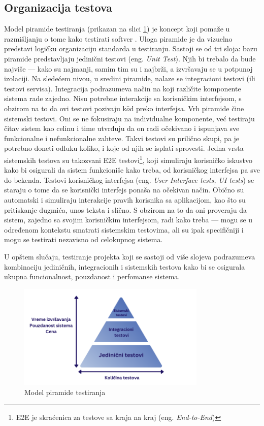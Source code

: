 \documentclass[12pt,oneside]{memoir}
\begin{document}
\subsection{Organizacija testova}
\par Model piramide testiranja (prikazan na slici \ref{fig:piramida}) je koncept koji pomaže u razmišljanju o tome kako testirati softver \cite{cohn}. Uloga piramide je da vizuelno predstavi logičku organizaciju standarda u testiranju. Sastoji se od tri sloja: bazu piramide predstavljaju jedinični testovi (eng. \emph{Unit Test}). Njih bi trebalo da bude najviše --- kako su najmanji, samim tim su i najbrži, a izvršavaju se u potpunoj izolaciji. Na sledećem nivou, u sredini piramide, nalaze se integracioni testovi (ili testovi servisa). Integracija podrazumeva način na koji različite komponente sistema rade zajedno. Nisu potrebne interakcije sa korisničkim interfejsom, s obzirom na to da ovi testovi pozivaju k$\hat{o}$d preko interfejsa. Vrh piramide čine sistemski testovi. Oni se ne fokusiraju na individualne komponente, već testiraju čitav sistem kao celinu i time utvrđuju da on radi očekivano i ispunjava sve funkcionalne i nefunkcionalne zahteve. Takvi testovi su prilično skupi, pa je potrebno doneti odluku koliko, i koje od njih se isplati sprovesti. Jedna vrsta sistemskih testova su takozvani E2E testovi\footnote{E2E je skraćenica za testove sa kraja na kraj (eng. \emph{End-to-End})}, koji simuliraju korisničko iskustvo kako bi osigurali da sistem funkcioniše kako treba, od korisničkog interfejsa pa sve do bekenda. Testovi korisničkog interfejsa (eng. \emph{User Interface tests, UI tests}) se staraju o tome da se korisnički interfejs ponaša na očekivan način. Obično su automatski i simuliraju interakcije pravih korisnika sa aplikacijom, kao što su pritiskanje dugmića, unos teksta i slično. S obzirom na to da oni proveraju da sistem, zajedno sa svojim korisničkim interfejsom, radi kako treba --- mogu se u određenom kontekstu smatrati sistemskim testovima, ali su ipak specifičniji i mogu se testirati nezavisno od celokupnog sistema. 
\par U opštem slučaju, testiranje projekta koji se sastoji od više slojeva podrazumeva kombinaciju jediničnih, integracionih i sistemskih testova kako bi se osigurala ukupna funcionalnost, pouzdanost i perfomanse sistema.

\begin{figure}[!ht]
  \centering
  \label{fig:piramida}
  \includegraphics[width=0.8\textwidth]{piramidanova.png}
  \caption{Model piramide testiranja}
\end{figure}
\end{document}
